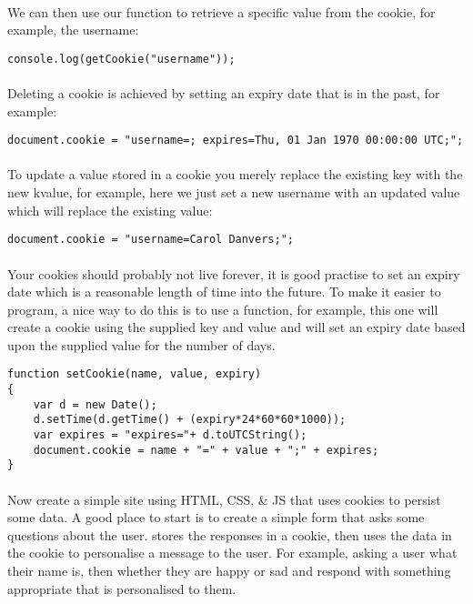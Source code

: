 \documentclass[10pt, a4paper]{article}
\begin{document}
\paragraph{} We can then use our function to retrieve a specific value from the cookie, for example, the username:

\begin{lstlisting}
console.log(getCookie("username"));
\end{lstlisting}

\paragraph{} Deleting a cookie is achieved by setting an expiry date that is in the past, for example:

\begin{lstlisting}
document.cookie = "username=; expires=Thu, 01 Jan 1970 00:00:00 UTC;";
\end{lstlisting}


\paragraph{} To update a value stored in a cookie you merely replace the existing key with the new kvalue, for example, here we just set a new username with an updated value which will replace the existing value:
\begin{lstlisting}
document.cookie = "username=Carol Danvers;";
\end{lstlisting}

\paragraph{} Your cookies should probably not live forever, it is good practise to set an expiry date which is a reasonable length of time into the future. To make it easier to program, a nice way to do this is to use a function, for example, this one will create a cookie using the supplied key and value and will set an expiry date based upon the supplied value for the number of days.

\begin{lstlisting}
function setCookie(name, value, expiry)
{
    var d = new Date();
    d.setTime(d.getTime() + (expiry*24*60*60*1000));
    var expires = "expires="+ d.toUTCString();
    document.cookie = name + "=" + value + ";" + expires;
}
\end{lstlisting}

\paragraph{} Now create a simple site using HTML, CSS, \& JS that uses cookies to persist some data. A good place to start is to create a simple form that asks some questions about the user. stores the responses in a cookie, then uses the data in the cookie to personalise a message to the user. For example, asking a user what their name is, then whether they are happy or sad and respond with something appropriate that is personalised to them.
\end{document}
